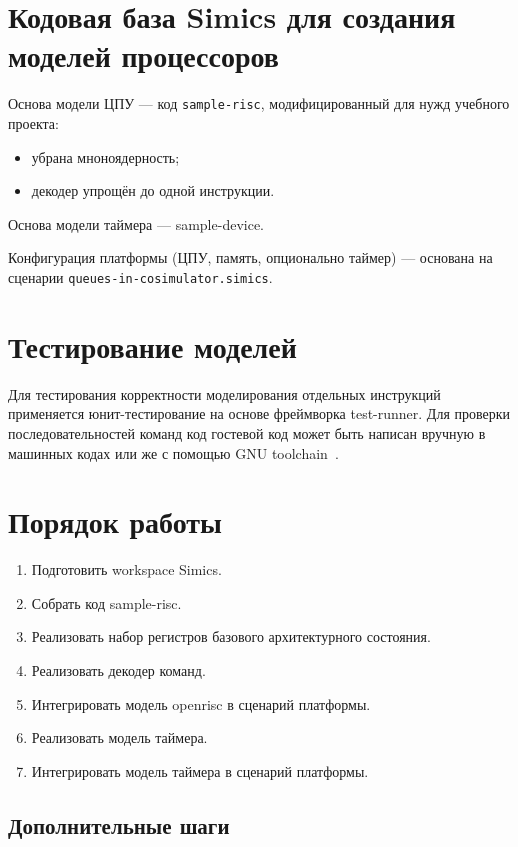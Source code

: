 \section{Кодовая база Simics для создания моделей процессоров}

Основа модели ЦПУ --- код \texttt{sample-risc}, модифицированный для нужд учебного проекта:
\begin{itemize}
    \item убрана мноноядерность;
    \item декодер упрощён до одной инструкции.
\end{itemize}

Основа модели таймера --- sample-device.

Конфигурация платформы (ЦПУ, память, опционально таймер) --- основана на сценарии \texttt{queues-in-cosimulator.simics}.

\section{Тестирование моделей}

Для тестирования корректности моделирования отдельных инструкций применяется юнит-тестирование на основе фреймворка test-runner. Для проверки последовательностей команд код гостевой код может быть написан вручную в машинных кодах или же с помощью GNU toolchain~\cite{or1k-toolchain}.


\section{Порядок работы}

\begin{enumerate}
\item Подготовить workspace Simics.
\item Собрать код sample-risc.
\item Реализовать набор регистров базового архитектурного состояния.
\item Реализовать декодер команд.
\item Интегрировать модель openrisc в сценарий платформы.
\item Реализовать модель таймера.
\item Интегрировать модель таймера в сценарий платформы.

\end{enumerate}

\subsection{Дополнительные шаги}

